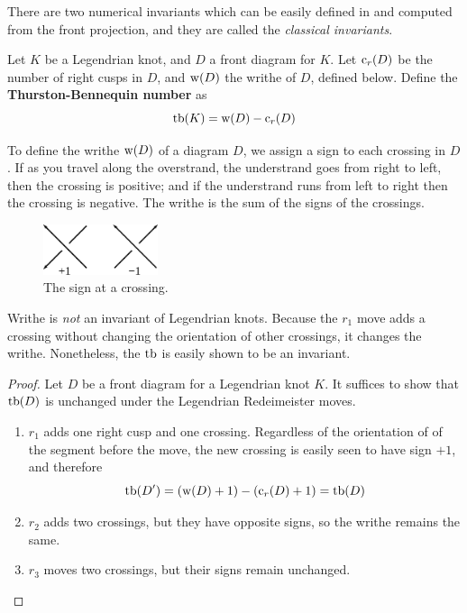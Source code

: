 There are two numerical invariants which can be easily defined in and computed from the front projection, and they are called the \emph{classical invariants}.
\begin{defn}
    Let $K$ be a Legendrian knot, and $D$ a front diagram for $K$. Let $\operatorname{c}_r(D)$ be the number of right cusps in $D$, and $\operatorname{w}(D)$ the writhe of $D$, defined below.
    Define the \textbf{Thurston-Bennequin number} as
    \[
        \operatorname{tb}(K) = \operatorname{w}(D) - \operatorname{c}_r(D)
    \]
\end{defn}
To define the writhe $\operatorname{w}(D)$ of a diagram $D$, we assign a sign to each crossing in $D$. If as you travel along the overstrand, the understrand goes from right to left, then the crossing is positive; and if the understrand runs from left to right then the crossing is negative. The writhe is the sum of the signs of the crossings.

\begin{figure}[ht]
    \centering
    \includegraphics[width=0.3\textwidth]{images/writhe.pdf}
    \caption{The sign at a crossing.}%
    \label{fig:writhe}
\end{figure}

Writhe is \emph{not} an invariant of Legendrian knots. Because the $r_1$ move adds a crossing without changing the orientation of other crossings, it changes the writhe. Nonetheless, the $\operatorname{tb}$ is easily shown to be an invariant.

\begin{proof}
    Let $D$ be a front diagram for a Legendrian knot $K$. It suffices to show that $\operatorname{tb}(D)$ is unchanged under the Legendrian Redeimeister moves.

    \begin{enumerate}
        \item $r_1$ adds one right cusp and one crossing. Regardless of the orientation of of the segment before the move, the new crossing is easily seen to have sign $+1$, and therefore
            \[
                \operatorname{tb}(D') = (\operatorname{w}(D) + 1) - (\operatorname{c}_r(D) + 1) = \operatorname{tb}(D)
            \]
        \item $r_2$ adds two crossings, but they have opposite signs, so the writhe remains the same.
        \item $r_3$ moves two crossings, but their signs remain unchanged.
    \end{enumerate}
    
\end{proof}

